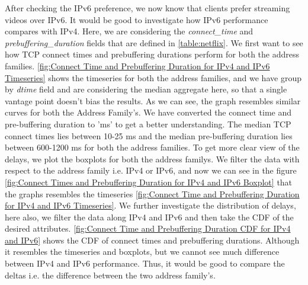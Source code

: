 After checking the IPv6 preference, we now know that clients prefer streaming videos over IPv6. It would be good to investigate how IPv6 performance compares with IPv4. Here,
we are considering the \textit{connect\_time} and \textit{prebuffering\_duration} fields that are defined in \cref{table:netflix}. We first want to see how TCP connect times and prebuffering durations perform for both the address families.
\cref{fig:Connect Time and Prebuffering Duration for IPv4 and IPv6 Timeseries} shows the timeseries for both the address families, and we have group by \textit{dtime} field and are considering the median aggregate here, so that a single vantage point doesn't bias the results.
As we can see, the graph resembles similar curves for both the Address Family’s. We have converted the connect time and pre-buffering duration to 'ms' to get a better understanding. The median TCP connect times lies between 10-25 ms and the median pre-buffering duration lies between 600-1200 ms for both the address families.
To get more clear view of the delays, we plot the boxplots for both the address familys. We filter the data with respect to the address family i.e. IPv4 or IPv6, and now we can see in the figure \cref{fig:Connect Times and Prebuffering Duration for IPv4 and IPv6 Boxplot} that the graphs resembles the timeseries \cref{fig:Connect Time and Prebuffering Duration for IPv4 and IPv6 Timeseries}.
We further investigate the distribution of delays, here also, we filter the data along IPv4 and IPv6 and then take the CDF of the desired attributes. \cref{fig:Connect Time and Prebuffering Duration CDF for IPv4 and IPv6} shows the CDF of connect times and prebuffering durations. Although it resembles the timeseries and boxplots, but we cannot see
much difference between IPv4 and IPv6 performance. Thus, it would be good to compare the deltas i.e. the difference between the two address family's.

